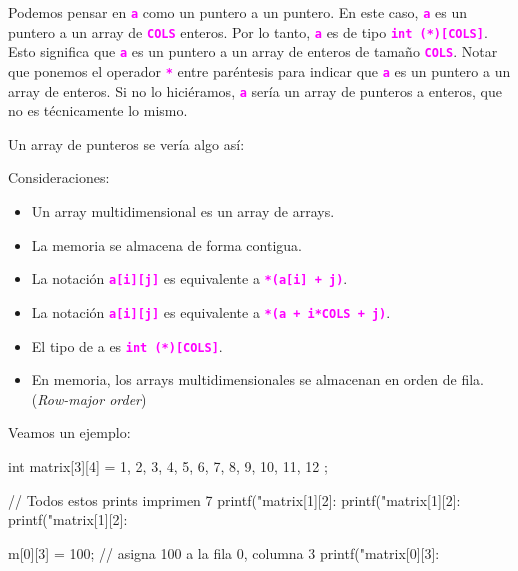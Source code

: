 \documentclass[]{scrartcl}
\newcommand{\hl}[1]{\textcolor{magenta}{\textbf{\texttt{#1}}}}
\begin{document}
Podemos pensar en \hl{a} como un puntero a un puntero. En este caso, \hl{a} es un puntero a un array de \hl{COLS} enteros. Por lo tanto, \hl{a} es de tipo \hl{int (*)[COLS]}. Esto significa que \hl{a} es un puntero a un array de enteros de tamaño \hl{COLS}. Notar que ponemos el operador \hl{*} entre paréntesis para indicar que \hl{a} es un puntero a un array de enteros. Si no lo hiciéramos, \hl{a} sería un array de punteros a enteros, que no es técnicamente lo mismo.

Un array de punteros se vería algo así:

\begin{center}
  \noindent {}
  \label{fig:array-of-pointers-meme}
\end{center}

Consideraciones:
\begin{itemize}
  \item Un array multidimensional es un array de arrays.
  \item La memoria se almacena de forma contigua.
  \item La notación \hl{a[i][j]} es equivalente a \hl{*(a[i] + j)}.
  \item La notación \hl{a[i][j]} es equivalente a \hl{*(a + i*COLS + j)}.
  \item El tipo de a es \hl{int (*)[COLS]}.
  \item En memoria, los arrays multidimensionales se almacenan en orden de fila. (\textit{Row-major order})
\end{itemize}

Veamos un ejemplo:

\begin{cbox}[]{}
  int matrix[3][4] = {
    {1, 2, 3, 4},
    {5, 6, 7, 8},
    {9, 10, 11, 12}
  };

  // Todos estos prints imprimen 7
  printf("matrix[1][2]: %
  printf("matrix[1][2]: %
  printf("matrix[1][2]: %

  m[0][3] = 100; // asigna 100 a la fila 0, columna 3
  printf("matrix[0][3]: %
\end{cbox}  
\end{document}
